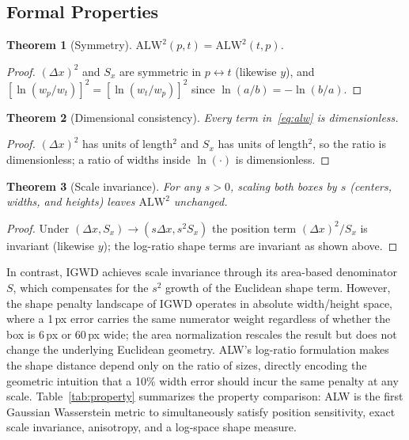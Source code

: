 \documentclass[journal]{IEEEtran}
\newtheorem{theorem}{Theorem}
\newcommand{\alwsq}{\text{ALW}^2}
\newcommand{\Sx}{S_x}
\begin{document}
\subsection{Formal Properties}
\label{sec:props}

\begin{theorem}[Symmetry]
$\alwsq(p,t)=\alwsq(t,p)$.
\end{theorem}
\begin{proof}
$(\Delta x)^2$ and $\Sx$ are symmetric in $p\leftrightarrow t$ (likewise $y$),
and $[\ln(w_p/w_t)]^2=[\ln(w_t/w_p)]^2$ since $\ln(a/b)=-\ln(b/a)$.
\end{proof}

\begin{theorem}[Dimensional consistency]
Every term in~\eqref{eq:alw} is dimensionless.
\end{theorem}
\begin{proof}
$(\Delta x)^2$ has units of length$^2$ and $\Sx$ has units of length$^2$, so the
ratio is dimensionless; a ratio of widths inside $\ln(\cdot)$ is dimensionless.
\end{proof}

\begin{theorem}[Scale invariance]
For any $s>0$, scaling both boxes by $s$ (centers, widths, and heights) leaves
$\alwsq$ unchanged.
\end{theorem}
\begin{proof}
Under $(\Delta x,\Sx)\!\to\!(s\Delta x, s^2\Sx)$ the position term
$(\Delta x)^2/\Sx$ is invariant (likewise $y$); the log-ratio shape terms are
invariant as shown above.
\end{proof}

In contrast, IGWD achieves scale invariance through its area-based
denominator $S$, which compensates for the $s^2$ growth of the Euclidean
shape term. However, the shape penalty landscape of IGWD operates in absolute
width/height space, where a 1\,px error carries the same numerator weight
regardless of whether the box is $6$\,px or $60$\,px wide; the area
normalization rescales the result but does not change the underlying
Euclidean geometry. ALW's log-ratio formulation makes the shape distance
depend only on the ratio of sizes, directly encoding the geometric intuition
that a 10\% width error should incur the same penalty at any scale.
Table~\ref{tab:property} summarizes the property
comparison: ALW is the first Gaussian Wasserstein metric to simultaneously satisfy position
sensitivity, exact scale invariance, anisotropy, and a log-space shape measure.
\end{document}
